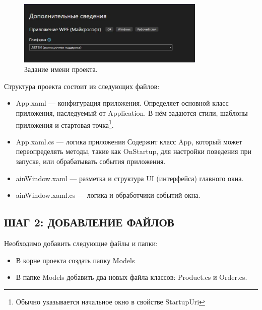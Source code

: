 \documentclass[12pt]{article}
\begin{document}
\begin{enumerate}
	      \begin{figure}[H]
		      \centering
		      \includegraphics[width=0.8\textwidth]{fig/net8.0.png}
		      \caption{Задание имени проекта.}
		      \label{fig:net8}
	      \end{figure}

\end{enumerate}

Структура проекта состоит из следующих файлов:

\begin{itemize}
	\item App.xaml — конфигурация приложения. Определяет основной класс приложения, наследуемый от Application. В нём задаются стили, шаблоны приложения и стартовая точка\footnote{Обычно указывается начальное окно в свойстве StartupUri}.
	\item App.xaml.cs — логика приложения Содержит класс App, который может переопределять методы, такие как OnStartup, для настройки поведения при запуске, или обрабатывать события приложения.
	\item ainWindow.xaml — разметка и структура UI (интерфейса) главного окна.
	\item ainWindow.xaml.cs — логика и обработчики событий окна.
\end{itemize}



\newpage

\subsection{ШАГ 2: ДОБАВЛЕНИЕ ФАЙЛОВ}

{}

Необходимо добавить следующие файлы и папки:
\begin{itemize}
	\item В корне проекта создать папку Models
	\item В папке Models добавить два новых файла классов: Product.cs и Order.cs.
\end{itemize}
\end{document}
